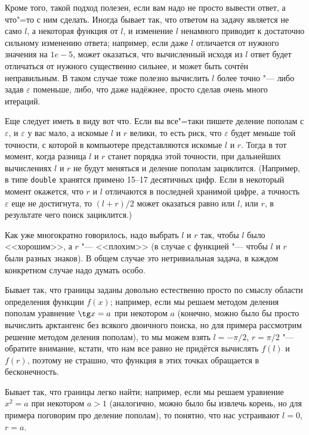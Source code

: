 \documentclass[a4paper,10pt]{problems}
\let\eps\varepsilon
\begin{document}
Кроме того, такой подход полезен, если вам надо не просто вывести ответ, а что"=то с ним сделать.
Иногда бывает так, что ответом на задачу является не само $l$, а некоторая функция от $l$, и изменение $l$ ненамного приводит
к достаточно сильному изменению ответа; например, если даже $l$ отличается от нужного значения на $1e{-}5$, может оказаться,
что вычисленный исходя из $l$ ответ будет отличаться от нужного существенно сильнее,
и может быть сочтён неправильным. 
В таком случае тоже полезно вычислить $l$ более точно "--- либо задав $\eps$ поменьше, либо, что даже надёжнее,
просто сделав очень много итераций.

Еще следует иметь в виду вот что. Если вы все"=таки пишете деление пополам с $\eps$, и $\eps$ у вас мало, а искомые $l$ и $r$ велики, 
то есть риск, что $\eps$ будет меньше той точности, с которой в компьютере представляются искомые $l$ и $r$. 
Тогда в тот момент, когда разница $l$ и $r$ станет порядка этой точности, при дальнейших вычислениях $l$ и $r$ не будут меняться и 
деление пополам зациклится. (Например, в типе \verb`double` хранятся примено 15--17 десятичных цифр. 
Если в некоторый момент окажется, что $r$ и $l$ отличаются в последней хранимой цифре, а точность $\eps$ еще не достигнута,
то $(l+r)/2$ может оказаться равно или $l$, или $r$, в результате чего поиск зациклится.)

 Как уже многократно говорилось, надо выбрать $l$ и $r$ так, чтобы $l$ было <<хорошим>>, а $r$ "--- <<плохим>>
(в случае с функцией "--- чтобы $l$ и $r$ были разных знаков). 
В общем случае это нетривиальная задача, в каждом конкретном случае надо думать особо.

Бывает так, что границы заданы довольно естественно просто по смыслу области определения функции $f(x)$;
например, если мы решаем методом деления пополам уравнение $\tg x=a$ при некотором $a$ 
(конечно, можно было бы просто вычислить арктангенс без всякого двоичного поиска, но для примера рассмотрим решение методом деления пополам), 
то мы можем взять $l=-\pi/2$, $r=\pi/2$ "--- обратите внимание, кстати, что нам все равно не придётся вычислять $f(l)$ и $f(r)$, поэтому не страшно,
что функция в этих точках обращается в бесконечность.

Бывает так, что границы легко найти; например, если мы решаем уравнение $x^2=a$ при некотором $a>1$
(аналогично, можно было бы извлечь корень, но для примера поговорим про деление пополам), то понятно,
что нас устраивают $l=0$, $r=a$.
\end{document}
